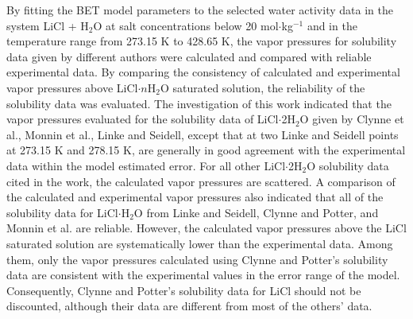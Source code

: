 \documentclass[11pt]{article}
\begin{document}
By fitting the BET model parameters to the selected water activity data in the
system LiCl + H$_2$O at salt concentrations below 20 mol$\cdot$kg$^{-1}$ and
in the temperature range from 273.15 K to 428.65 K, the vapor pressures for
solubility data given by different authors were calculated and compared with
reliable experimental data. By comparing the consistency of calculated and
experimental vapor pressures above LiCl$\cdot n$H$_2$O saturated solution, the
reliability of the solubility data was evaluated. The investigation of this
work indicated that the vapor pressures evaluated for the solubility data of
LiCl$\cdot$2H$_2$O given by Clynne et al., Monnin et al., Linke and Seidell,
except that at two Linke and Seidell points at 273.15 K and 278.15 K, are
generally in good agreement with the experimental data within the model
estimated error. For all other LiCl$\cdot$2H$_2$O solubility data cited in the
work, the calculated vapor pressures are scattered. A comparison of the
calculated and experimental vapor pressures also indicated that all of the
solubility data for LiCl$\cdot$H$_2$O from Linke and Seidell, Clynne and
Potter, and Monnin et al. are reliable. However, the calculated vapor
pressures above the LiCl saturated solution are systematically lower than the
experimental data. Among them, only the vapor pressures calculated using
Clynne and Potter's solubility data are consistent with the experimental
values in the error range of the model. Consequently, Clynne and Potter's
solubility data for LiCl should not be discounted, although their data are
different from most of the others' data.
\end{document}
